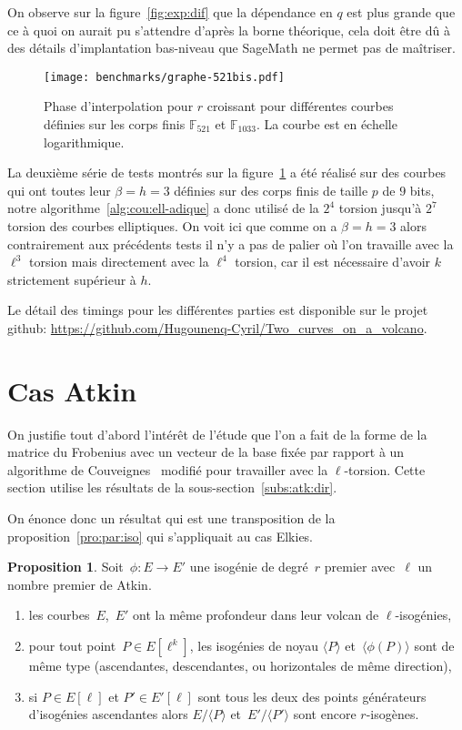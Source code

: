 \documentclass[10pt,a4paper]{book}
\theoremstyle{plain}
\theoremstyle{definition}
\theoremstyle{definition}
\theoremstyle{definition}
\newtheorem{prop}[thm]{Proposition}
\theoremstyle{definition}
\theoremstyle{remark}
\theoremstyle{remark}
\theoremstyle{definition}
\begin{document}
On observe sur la figure~\ref{fig:exp:dif} que la dépendance en $q$ est plus 
grande que ce à quoi on aurait pu s'attendre d'après la borne théorique, cela 
doit être dû à des détails d'implantation bas-niveau que SageMath ne permet pas
de maîtriser.

\begin{figure}
%
\texttt{[image: benchmarks/graphe-521bis.pdf]} 
\caption{\label{fig:exp:niv} Phase d'interpolation pour $r$ croissant pour différentes courbes définies sur les corps finis $\mathbb{F}_{521}$ et $\mathbb{F}_{1033}$. La courbe est en échelle logarithmique.}
\end{figure}

La deuxième série de tests montrés sur la figure~\ref{fig:exp:niv} a été réalisé
sur des courbes qui ont toutes leur $\beta=h=3$ définies sur des corps finis de
taille $p$ de $9$ bits, notre algorithme~\ref{alg:cou:ell-adique} a donc utilisé de la 
$2^4$ torsion jusqu'à $2^7$ torsion des courbes elliptiques. On voit ici que comme on a 
$\beta=h=3$ alors contrairement aux précédents tests il n'y a pas de palier où l'on travaille avec la 
$\ell^{3}$ torsion mais directement avec la $\ell^4$ torsion, car il est 
nécessaire d'avoir $k$ strictement supérieur à $h$.

Le détail des timings pour les 
différentes parties est disponible sur le projet github: 
\url{https://github.com/Hugounenq-Cyril/Two_curves_on_a_volcano}. 

\section{Cas Atkin}
\label{sec:Atk:Con}
On justifie tout d'abord l'intérêt de l'étude que l'on a fait de la forme de 
la matrice du Frobenius avec un vecteur de la base fixée par rapport à un 
algorithme de Couveignes~\cite{Couveignes96} modifié pour travailler avec la
$\ell$-torsion. Cette section utilise les résultats de la 
sous-section~\ref{subs:atk:dir}.

On énonce donc un résultat qui est une transposition de la 
proposition~\ref{pro:par:iso} qui s'appliquait au cas Elkies.

\begin{prop}\label{pro:par:iso:atk}
Soit~$\phi: E \rightarrow E'$ une isogénie de degré~$r$ premier avec~$\ell$ un 
nombre premier de Atkin.
\begin{enumerate}
\item les courbes~$E$,~$E'$ ont la même profondeur dans leur volcan de
 $\ell$-isogénies,
\item\label{pro:par:fun:atk} pour tout point~$P \in E[\ell^k]$,
les isogénies de noyau $\langle P \rangle$ et~$\langle \phi(P) \rangle$ sont de
même type (ascendantes, descendantes, ou horizontales de même direction),
\item\label{pro:par:asc:atk} si $P \in E[\ell]$ et $P' \in E'[\ell]$ sont tous 
les deux des points générateurs d'isogénies ascendantes alors $E/\langle P 
\rangle$ et~$E'/\langle P' \rangle$ sont encore $r$-isogènes.
\end{enumerate}
\end{prop}
\end{document}
